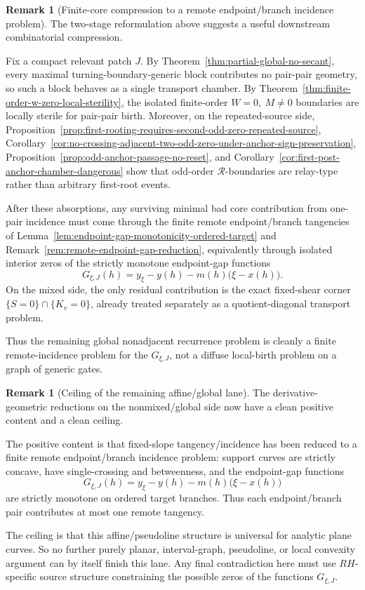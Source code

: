 \documentclass[11pt,a4paper]{amsart}
\def\RH{RH}%
\theoremstyle{plain}
\theoremstyle{definition}
\newtheorem{remark}[theorem]{Remark}
\newcommand{\RH}{\mathrm{RH}}
\begin{document}
\begin{remark}[Finite-core compression to a remote endpoint/branch incidence problem]
\label{rem:finite-core-compression-defect-gate-graph}
The two-stage reformulation above suggests a useful downstream combinatorial
compression.

Fix a compact relevant patch $J$. By
Theorem~\ref{thm:partial-global-no-secant}, every maximal
turning-boundary-generic block contributes no pair-pair geometry, so such a
block behaves as a single transport chamber. By
Theorem~\ref{thm:finite-order-w-zero-local-sterility}, the isolated
finite-order $W=0,\ M\neq 0$ boundaries are locally sterile for pair-pair
birth. Moreover, on the repeated-source side,
Proposition~\ref{prop:first-rooting-requires-second-odd-zero-repeated-source},
Corollary~\ref{cor:no-crossing-adjacent-two-odd-zero-under-anchor-sign-preservation},
Proposition~\ref{prop:odd-anchor-passage-no-reset}, and
Corollary~\ref{cor:first-post-anchor-chamber-dangerous} show that odd-order
$\mathcal R$-boundaries are relay-type rather than arbitrary first-root events.

After these absorptions, any surviving minimal bad core contribution from
one-pair incidence must come through the finite remote endpoint/branch
tangencies of
Lemma~\ref{lem:endpoint-gap-monotonicity-ordered-target} and
Remark~\ref{rem:remote-endpoint-gap-reduction}, equivalently through isolated
interior zeros of the strictly monotone endpoint-gap functions
\[
G_{\xi,J}(h)=y_\xi-y(h)-m(h)\bigl(\xi-x(h)\bigr).
\]
On the mixed side, the only residual contribution is the exact fixed-shear
corner $\{S=0\}\cap\{K_v=0\}$, already treated separately as a
quotient-diagonal transport problem.

Thus the remaining global nonadjacent recurrence problem is cleanly a finite
remote-incidence problem for the $G_{\xi,J}$, not a diffuse local-birth problem
on a graph of generic gates.
\end{remark}

\begin{remark}[Ceiling of the remaining affine/global lane]
\label{rem:ceiling-remaining-affine-global-lane}
The derivative-geometric reductions on the nonmixed/global side now have a
clean positive content and a clean ceiling.

The positive content is that fixed-slope tangency/incidence has been reduced to
a finite remote endpoint/branch incidence problem: support curves are strictly
concave, have single-crossing and betweenness, and the endpoint-gap functions
\[
G_{\xi,J}(h)=y_\xi-y(h)-m(h)\bigl(\xi-x(h)\bigr)
\]
are strictly monotone on ordered target branches. Thus each endpoint/branch
pair contributes at most one remote tangency.

The ceiling is that this affine/pseudoline structure is universal for analytic
plane curves. So no further purely planar, interval-graph, pseudoline, or local
convexity argument can by itself finish this lane. Any final contradiction here
must use $\RH$-specific source structure constraining the possible zeros of the
functions $G_{\xi,J}$.
\end{remark}
\end{document}
